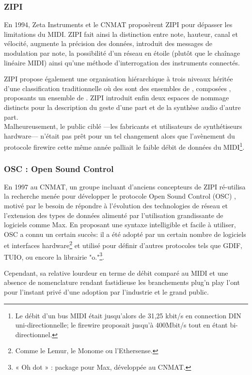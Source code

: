 \subsubsection{ZIPI}
En 1994, Zeta Instruments et le \gls{CNMAT} proposèrent ZIPI\cite{mcmillen_zipi_1994} pour dépasser les limitations du MIDI. ZIPI fait ainsi la distinction entre note, hauteur, canal et vélocité, augmente la précision des données, introduit des messages de modulation par note, la possibilité d'un réseau en étoile (plutôt que le chaînage linéaire MIDI) ainsi qu'une méthode d'interrogation des instruments connectés.

ZIPI propose également une organisation hiérarchique à trois niveaux héritée d'une classification traditionnelle où des  sont des ensembles de , composées , proposants un ensemble de . ZIPI introduit enfin deux espaces de nommage distincts pour la description du geste d'une part et de la synthèse audio d'autre part.\\
Malheureusement, le public ciblé —les fabricants et utilisateurs de synthétiseurs hardware— n'était pas prêt pour un tel changement alors que l'avènement du protocole \gls{firewire} cette même année palliait le faible débit de données du MIDI\footnote{ Le débit d'un bus MIDI était jusqu'alors de 31,25 kbit/s en connection DIN uni-directionnelle; le \gls{firewire} proposait jusqu'à 400Mbit/s tout en étant bi-directionnel.}.

\subsubsection{OSC : Open Sound Control}
En 1997 au \gls{CNMAT}, un groupe incluant d'anciens concepteurs de ZIPI ré-utilisa la recherche menée pour développer le protocole Open Sound Control (OSC) \cite{wright_open_1997}, motivé par le besoin de répondre à l'évolution des technologies de réseau et l'extension des types de données alimenté par l'utilisation grandissante de logiciels comme Max. En proposant une syntaxe intelligible et facile à utiliser, OSC a connu un certain succès: il a été adopté par un certain nombre de logiciels et interfaces hardware\footnote{ Comme le Lemur, le Monome ou l'Ethersense.} et utilisé pour définir d'autres protocoles tels que GDIF, TUIO, ou encore la librairie "o."\footnote{ « Oh dot » : package pour Max, développée au \gls{CNMAT}.}.

Cependant, sa relative lourdeur en terme de débit comparé au MIDI \cite{fraietta_open_2008} et une absence de nomenclature rendant fastidieuse les branchements plug'n play l'ont pour l'instant privé d'une adoption par l'industrie et le grand public.

